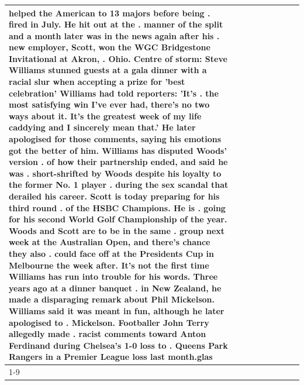 \begin{table}[H]
\begin{tabular}{lllrlllll}
helped the American to 13 majors before being . fired in July. He hit out at the . manner of the split and a month later was in the news again after his . new employer, Scott, won the WGC Bridgestone Invitational at Akron, . Ohio. Centre of storm: Steve Williams stunned guests at a gala dinner with a racial slur when accepting a prize for 'best celebration' Williams had told reporters: 'It's . the most satisfying win I've ever had, there's no two ways about it. It's the greatest week of my life caddying and I sincerely mean that.' He later apologised for those comments, saying his emotions got the better of him. Williams has disputed Woods' version . of how their partnership ended, and said he was . short-shrifted by Woods despite his loyalty to the former No. 1 player . during the sex scandal that derailed his career. Scott is today preparing for his third round . of the HSBC Champions. He is . going for his second World Golf Championship of the year. Woods and Scott are to be in the same . group next week at the Australian Open, and there's chance they also . could face off at the Presidents Cup in Melbourne the week after. It's not the first time Williams has run into trouble for his words. Three years ago at a dinner banquet . in New Zealand, he made a disparaging remark about Phil Mickelson. Williams said it was meant in fun, although he later apologised to . Mickelson. Footballer John Terry allegedly made . racist comments toward Anton Ferdinand during Chelsea's 1-0 loss to . Queens Park Rangers in a Premier League loss last month.glas \\
\cline{1-9}

\end{tabular}
\end{table}
